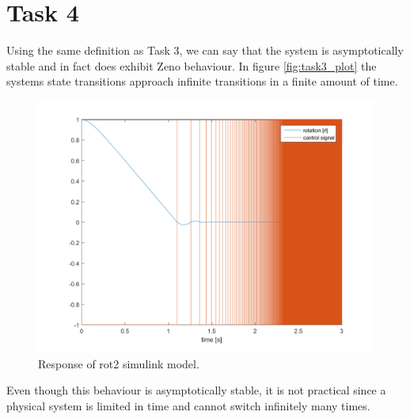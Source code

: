 \documentclass[a4paper,12pt,oneside,onecolumn]{article} %
\begin{document}
\section*{Task 4}
Using the same definition as Task 3, we can say that the system
is asymptotically stable and in fact does exhibit Zeno
behaviour. In figure \ref{fig:task3_plot} the systems state
transitions approach infinite transitions in a finite amount of time. 
\begin{figure}[H]
    \centering
    \includegraphics[scale = 0.5]{../matlab/images/task4_plot.png}
    \caption{Response of rot2 simulink model.}
    \label{fig:task4_plot}
\end{figure}
Even though this behaviour is asymptotically stable, it is not practical since a
physical system is limited in time and cannot switch infinitely many times.
\end{document}
